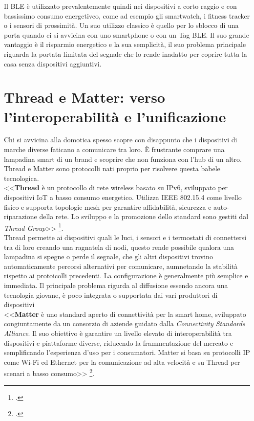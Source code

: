 Il BLE è utilizzato prevalentemente quindi nei dispositivi a corto raggio e con bassissimo consumo energetivco, come ad esempio gli smartwatch, i fitness tracker o i sensori di prossimità. Un suo utilizzo classico è quello per lo sblocco di una porta quando ci si avvicina con uno smartphone o con un Tag BLE. Il suo grande vantaggio è il risparmio energetico e la sua semplicità, il suo problema principale riguarda la portata limitata del segnale che lo rende inadatto per coprire tutta la casa senza dispositivi aggiuntivi.

\section{Thread e Matter: verso l'interoperabilità e l'unificazione}
Chi si avvicina alla domotica spesso scopre con disappunto che i dispositivi di marche diverse faticano a comunicare tra loro. È frustrante comprare una lampadina smart di un brand e scoprire che non funziona con l'hub di un altro. Thread e Matter sono protocolli nati proprio per risolvere questa babele tecnologica.\\

<<\textbf{Thread} è un protocollo di rete wireless basato su IPv6, sviluppato per dispositivi IoT a basso consumo energetico. Utilizza IEEE 802.15.4 come livello fisico e supporta topologie mesh per garantire affidabilità, sicurezza e auto-riparazione della rete. Lo sviluppo e la promozione dello standard sono gestiti dal \emph{Thread Group}>> \footcite{thread_group}.\\

Thread permette ai dispositivi quali le luci, i sensori e i termostati di connettersi tra di loro creando una ragnatela di nodi, questo rende possibile qualora una lampadina si spegne o perde il segnale, che gli altri dispositivi trovino automaticamente percorsi alternativi per comunicare, aumnetando la stabilità rispetto ai protoicolli precedenti. La configurazione è generalmente più semplice e immediata. Il principale problema rigurda al diffusione essendo ancora una tecnologia giovane, è poco integrata o supportata dai vari produttori di dispositivi\\

<<\textbf{Matter} è uno standard aperto di connettività per la smart home, sviluppato congiuntamente da un consorzio di aziende guidato dalla \emph{Connectivity Standards Alliance}. Il suo obiettivo è garantire un livello elevato di interoperabilità tra dispositivi e piattaforme diverse, riducendo la frammentazione del mercato e semplificando l’esperienza d’uso per i consumatori. Matter si basa su protocolli IP come Wi-Fi ed Ethernet per la comunicazione ad alta velocità e su Thread per scenari a basso consumo>> \footcite{csa_matter}.\\


